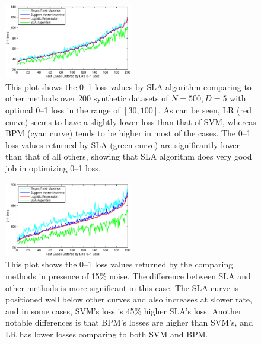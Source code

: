 \begin{figure}[ht!]
\includegraphics[width=0.50\textwidth]{images/fig61_621a.eps}
\caption{ This plot shows the 0--1 loss values by SLA algorithm
  comparing to other methods over 200 synthetic datasets of $N=500,
  D=5$ with optimal 0--1 loss in the range of $[30, 100]$. As can be
  seen, LR (red curve) seems to have a slightly lower loss than that
  of SVM, whereas BPM (cyan curve) tends to be higher in most of the
  cases. The 0--1 loss values returned by SLA (green curve) are
  significantly lower than that of all others, showing that SLA
  algorithm does very good job in optimizing 0--1 loss.  }
\label{fig:621a}
\end{figure}

\begin{figure}[here]
\includegraphics[width=0.50\textwidth]{images/fig61_621b.eps}
\caption{ This plot shows the 0--1 loss values returned by the
  comparing methods in presence of 15\% noise. The difference between
  SLA and other methods is more significant in this case. The SLA
  curve is positioned well below other curves and also increases at
  slower rate, and in some cases, SVM's loss is 45\% higher SLA's
  loss. Another notable differences is that BPM's losses are higher
  than SVM's, and LR has lower losses comparing to both SVM and BPM.
}
\label{fig:621b}
\end{figure}

